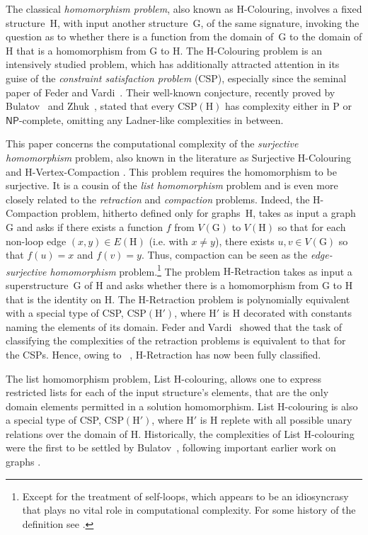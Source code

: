\documentclass[a4paper,12pt]{article}
\theoremstyle{remark}
\newcommand{\NP}[0]{\ensuremath{\mathsf{NP}}}
\newcommand{\G}{\ensuremath{\mathrm{G}}}
\renewcommand{\H}{\ensuremath{\mathrm{H}}}
\begin{document}
The classical \emph{homomorphism problem}, also known as {\sc $\H$-Colouring},
involves a fixed structure~$\H$, with input another structure~$\G$, of the same signature, invoking the question as to whether there is a function from the domain of~$\G$ to the domain of $\H$ that is a homomorphism from $\G$ to $\H$. 
The {\sc $\H$-Colouring} problem is an intensively studied problem, which has additionally attracted attention in its guise of the \emph{constraint satisfaction problem} (CSP), especially since the seminal paper of Feder and
Vardi~\cite{FederVardi}. 
Their well-known conjecture, recently proved by Bulatov~\cite{FVproofBulatov} and Zhuk~\cite{FVproofZhuk}, stated that every CSP$(\H)$ has complexity either in P or \NP-complete, omitting any Ladner-like complexities in between. 

This paper concerns the computational complexity of 
the \emph{surjective homomorphism} problem, also known in the literature as {\sc Surjective $\H$-Colouring} \cite{CiE2017,GolovachPS12} and {\sc $\H$-Vertex-Compaction} \cite{VikasAlgorithmica}. This problem requires the homomorphism
to be surjective.
It is a cousin of the \emph{list homomorphism} problem and is even more closely related to the \emph{retraction} and \emph{compaction} problems. Indeed, the {\sc $\H$-Compaction} problem, hitherto defined only for graphs~$\H$, takes as input a graph $\G$ and asks if there exists a function $f$ from $V(\G)$ to $V(\H)$ so that for each non-loop edge $(x,y) \in E(\H)$ (\mbox{i.e.} with $x\neq y$), there exists $u,v \in V(\G)$ so that $f(u)=x$ and $f(v)=y$. Thus, compaction can be seen as the \emph{edge-surjective homomorphism} problem.\footnote{Except for the treatment of self-loops, which appears to be an idiosyncrasy that plays no vital role in computational complexity. For some history of the definition see \cite{VikasReflexive}.} The problem {\sc $\H$-Retraction} takes as input a superstructure~$\G$ of $\H$ and asks whether there is a homomorphism from $\G$ to $\H$ that is the identity on $\H$. 
The {\sc $\H$-Retraction} problem is polynomially equivalent with a special type of CSP, CSP$(\H')$, where $\H'$ is $\H$ decorated with constants naming the elements of its domain.
 Feder and Vardi~\cite{FederVardi} showed that
the task of classifying the complexities of the retraction problems is equivalent to that for the CSPs. 
Hence, owing to ~\cite{FVproofBulatov,FVproofZhuk}, {\sc $\H$-Retraction} has now been fully classified.

The list homomorphism problem, {\sc List $\H$-colouring}, allows one to express restricted lists for each of the input structure's elements, that are the only domain elements permitted in a solution homomorphism. {\sc List $\H$-colouring} is also a special type of CSP, CSP$(\H')$, where $\H'$ is $\H$ replete with all possible unary relations over the domain of $\H$. Historically, the complexities of {\sc List $\H$-colouring} were the first to be settled by Bulatov~\cite{ConservativeJournal}, following important earlier work on graphs \cite{FederHell98,FederHellHuang99,FHH03}. 
\end{document}
